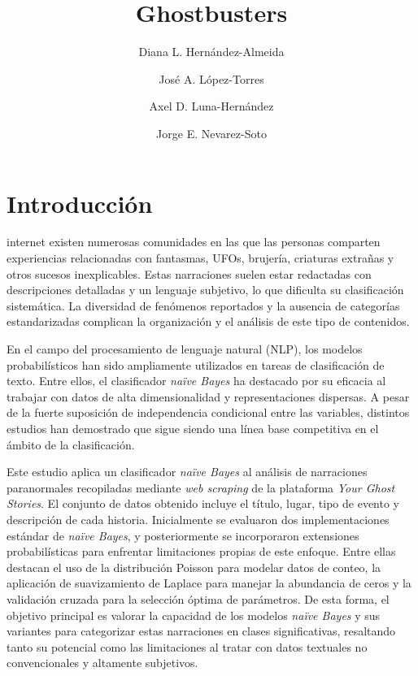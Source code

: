 \documentclass[eng]{ajceam-class}
\title{Ghostbusters}
\author[1]{Diana L. Hernández-Almeida}
\author[1]{José A. López-Torres}
\author[1]{Axel D. Luna-Hernández}
\author[1]{Jorge E. Nevarez-Soto}
\affil[1]{Tecnologico de Monterrey}
\begin{document}
\maketitle
\thispagestyle{fancy}



\section{Introducción}
internet existen numerosas comunidades en las que las personas comparten experiencias relacionadas con fantasmas, UFOs, brujería, criaturas extrañas y otros sucesos inexplicables. Estas narraciones suelen estar redactadas con descripciones detalladas y un lenguaje subjetivo, lo que dificulta su clasificación sistemática. La diversidad de fenómenos reportados y la ausencia de categorías estandarizadas complican la organización y el análisis de este tipo de contenidos.  

En el campo del procesamiento de lenguaje natural (NLP), los modelos probabilísticos han sido ampliamente utilizados en tareas de clasificación de texto\cite{zhang2004naive, mccallum1998comparison}. Entre ellos, el clasificador \textit{naïve Bayes} ha destacado por su eficacia al trabajar con datos de alta dimensionalidad y representaciones dispersas. A pesar de la fuerte suposición de independencia condicional entre las variables, distintos estudios han demostrado que sigue siendo una línea base competitiva en el ámbito de la clasificación.  

Este estudio aplica un clasificador \textit{naïve Bayes} al análisis de narraciones paranormales recopiladas mediante \textit{web scraping} de la plataforma \textit{Your Ghost Stories}. El conjunto de datos obtenido incluye el título, lugar, tipo de evento y descripción de cada historia. Inicialmente se evaluaron dos implementaciones estándar de \textit{naïve Bayes}, y posteriormente se incorporaron extensiones probabilísticas para enfrentar limitaciones propias de este enfoque. Entre ellas destacan el uso de la distribución Poisson para modelar datos de conteo, la aplicación de suavizamiento de Laplace para manejar la abundancia de ceros y la validación cruzada para la selección óptima de parámetros. De esta forma, el objetivo principal es valorar la capacidad de los modelos \textit{naïve Bayes} y sus variantes para categorizar estas narraciones en clases significativas, resaltando tanto su potencial como las limitaciones al tratar con datos textuales no convencionales y altamente subjetivos.  
\end{document}
